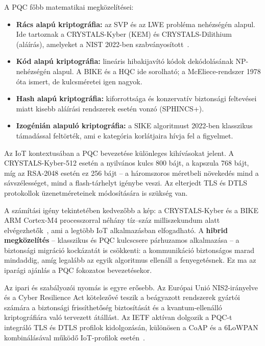 A PQC főbb matematikai megközelítései:
\begin{itemize}
    \item \textbf{Rács alapú kriptográfia:} az SVP és az LWE probléma nehézségén alapul.
          Ide tartoznak a CRYSTALS-Kyber (KEM) és CRYSTALS-Dilithium (aláírás),
          amelyeket a NIST 2022-ben szabványosított~\cite{NIST-Select-2022}.
    \item \textbf{Kód alapú kriptográfia:} lineáris hibakijavító kódok dekódolásának
          NP-nehézségén alapul. A BIKE és a HQC ide sorolható; a McEliece-rendszer
          1978 óta ismert, de kulcsméretei igen nagyok.
    \item \textbf{Hash alapú kriptográfia:} kiforrottsága és konzervatív biztonsági
          feltevései miatt kisebb aláírási rendszerek esetén vonzó (SPHINCS+).
    \item \textbf{Izogénián alapuló kriptográfia:} a SIKE algoritmust 2022-ben klasszikus
          támadással feltörték, ami e kategória korlátjaira hívja fel a figyelmet.
\end{itemize}

Az IoT kontextusában a PQC bevezetése különleges kihívásokat jelent. A CRYSTALS-Kyber-512
esetén a nyilvános kulcs 800 bájt, a kapszula 768 bájt, míg az RSA-2048 esetén ez 256 bájt --
a háromszoros méretbeli növekedés mind a sávszélességet, mind a flash-tárhelyt igénybe veszi.
Az elterjedt TLS és DTLS protokollok üzenetméreteinek módosítására is szükség van.

A számítási igény tekintetében kedvezőbb a kép: a CRYSTALS-Kyber és a BIKE ARM Cortex-M4
processzorral néhány tíz--száz milliszekundum alatt elvégezhetők~\cite{CRYSTALS-KYBER, BIKE-SPEC},
ami a legtöbb IoT alkalmazásban elfogadható. A \textbf{hibrid megközelítés} -- klasszikus és
PQC kulcscsere párhuzamos alkalmazása -- a biztonsági migráció kockázatát is csökkenti: a
kommunikáció biztonságos marad mindaddig, amíg legalább az egyik algoritmus ellenáll
a fenyegetésnek. Ez ma az iparági ajánlás a PQC fokozatos bevezetésekor.

Az ipari és szabályozói nyomás is egyre erősebb. Az Európai Unió NIS2-irányelve és a Cyber
Resilience Act kötelezővé teszik a beágyazott rendszerek gyártói számára a biztonsági
frissíthetőség biztosítását és a kvantum-ellenálló kriptográfiára való tervezett átállást.
Az IETF aktívan dolgozik a PQC-t integráló TLS és DTLS profilok kidolgozásán, különösen a
CoAP és a 6LoWPAN kombinálásával működő IoT-profilok esetén~\cite{NIST-PQC}.


